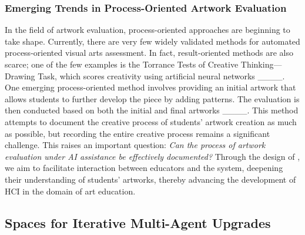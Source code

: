 \subsubsection{Emerging Trends in Process-Oriented Artwork Evaluation}
In the field of artwork evaluation, process-oriented approaches are beginning to take shape. Currently, there are very few widely validated methods for automated process-oriented visual arts assessment. In fact, result-oriented methods are also scarce; one of the few examples is the Torrance Tests of Creative Thinking—Drawing Task, which scores creativity using artificial neural networks ____. One emerging process-oriented method involves providing an initial artwork that allows students to further develop the piece by adding patterns. The evaluation is then conducted based on both the initial and final artworks ____. This method attempts to document the creative process of students' artwork creation as much as possible, but recording the entire creative process remains a significant challenge. This raises an important question: \textit{Can the process of artwork evaluation under AI assistance be effectively documented?} Through the design of \dataset, we aim to facilitate interaction between educators and the system, deepening their understanding of students' artworks, thereby advancing the development of HCI in the domain of art education.

\subsection{Spaces for Iterative Multi-Agent Upgrades}
